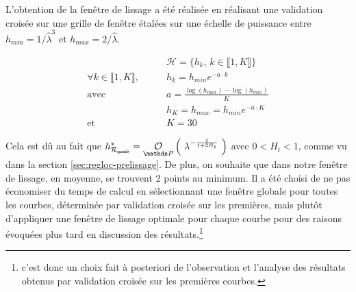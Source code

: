 L'obtention de la fenêtre de lissage a été réalisée en réalisant une validation croisée sur une grille de fenêtre étalées sur une échelle de puissance entre $h_{min} = 1 / \widehat \lambda^3$ et $h_{max} = 2 / \widehat \lambda$.

\begin{align*}
	                                                 & \mathcal H = \bigl\{ h_k, \, k \in \llbracket 1, K \rrbracket \bigr\}
	\\
	\forall k \in \llbracket 1, K \rrbracket, \qquad & h_k = h_{min} e^{ - a \cdot k }
	\\
	\text{avec } \qquad                              & a = \frac{\log \left( h_{max} \right) - \log(h_{min})}{K}
	\\
	                                                 & h_K = h_{max} = h_{min} e^{ - a \cdot K }
	\\
	\text{et } \qquad                                & K = 30
\end{align*}

Cela est dû au fait que $h^*_{\mathcal R_{\textsf{quadr}}} = \grandop{ \lambda^{- \frac 1 {1 + 2H_t}} }$ avec $0<H_t<1$, comme vu dans la section \ref{sec:regloc-prelissage}. De plus, on souhaite que dans notre fenêtre de lissage, en moyenne, se trouvent 2 points au minimum. Il a été choisi de ne pas économiser du temps de calcul en sélectionnant une fenêtre globale pour toutes les courbes, déterminée par validation croisée sur les premières, mais plutôt d'appliquer une fenêtre de lissage optimale pour chaque courbe pour des raisons évoquées plus tard en discussion des résultats.\footnote{c'est donc un choix fait à posteriori de l'observation et l'analyse des résultats obtenus par validation croisée sur les premières courbes.}

